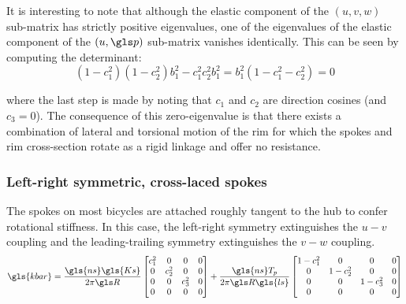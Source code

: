 \documentclass[\rootdir/thesis.tex]{subfiles}
\begin{document}
It is interesting to note that although the elastic component of the $(u,v,w)$ sub-matrix has strictly positive eigenvalues, one of the eigenvalues of the elastic component of the $(u,\p)$ sub-matrix vanishes identically. This can be seen by computing the determinant:
\begin{equation}
(1-c_1^2)(1-c_2^2)b_1^2 - c_1^2c_2^2b_1^2 = b_1^2(1 - c_1^2 - c_2^2) = 0
\end{equation}

where the last step is made by noting that $c_1$ and $c_2$ are direction cosines (and $c_3=0$). The consequence of this zero-eigenvalue is that there exists a combination of lateral and torsional motion of the rim for which the spokes and rim cross-section rotate as a rigid linkage and offer no resistance.

\subsubsection*{Left-right symmetric, cross-laced spokes}
The spokes on most bicycles are attached roughly tangent to the hub to confer rotational stiffness. In this case, the left-right symmetry extinguishes the $u-v$ coupling and the leading-trailing symmetry extinguishes the $v-w$ coupling.
\begin{equation}
\label{eq:kbar_symm_ncross}
\gls{kbar} = \frac{\gls{ns} \gls{Ks}}{2\pi \R}
\begin{bmatrix}
c_1^2     & 0     & 0 & 0\\
0 & c_2^2 & 0     & 0\\
0 & 0     & c_3^2 & 0\\
0 & 0     & 0     & 0
\end{bmatrix} +
\frac{\gls{ns} T_p}{2\pi \R \gls{ls}}
\begin{bmatrix}
1-c_1^2 & 0       & 0       & 0\\
0       & 1-c_2^2 & 0       & 0\\
0       & 0       & 1-c_3^2 & 0\\
0       & 0       & 0       & 0
\end{bmatrix}
\end{equation}
\end{document}
